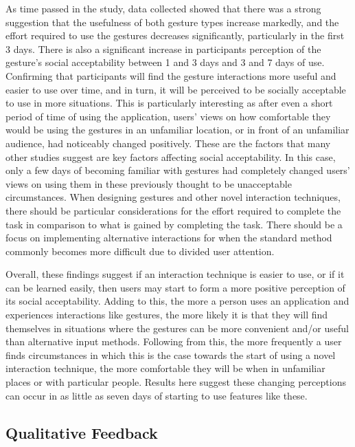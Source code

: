 \documentclass{l4proj}
\begin{document}
As time passed in the study, data collected showed that there was a strong suggestion that the usefulness of both gesture types increase markedly, and the effort required to use the gestures decreases significantly, particularly in the first 3 days. There is also a significant increase in participants perception of the gesture’s social acceptability between 1 and 3 days and 3 and 7 days of use. Confirming that participants will find the gesture interactions more useful and easier to use over time, and in turn, it will be perceived to be socially acceptable to use in more situations. This is particularly interesting as after even a short period of time of using the application, users’ views on how comfortable they would be using the gestures in an unfamiliar location, or in front of an unfamiliar audience, had noticeably changed positively. These are the factors that many other studies \citep{rico_usable_2010, freeman_rhythmic_2017, ahlstrom_are_2014} suggest are key factors affecting social acceptability. In this case, only a few days of becoming familiar with gestures had completely changed users’ views on using them in these previously thought to be unacceptable circumstances. When designing gestures and other novel interaction techniques, there should be particular considerations for the effort required to complete the task in comparison to what is gained by completing the task. There should be a focus on implementing alternative interactions for when the standard method commonly becomes more difficult due to divided user attention.

Overall, these findings suggest if an interaction technique is easier to use, or if it can be learned easily, then users may start to form a more positive perception of its social acceptability. Adding to this, the more a person uses an application and experiences interactions like gestures, the more likely it is that they will find themselves in situations where the gestures can be more convenient and/or useful than alternative input methods. Following from this, the more frequently a user finds circumstances in which this is the case towards the start of using a novel interaction technique, the more comfortable they will be when in unfamiliar places or with particular people. Results here suggest these changing perceptions can occur in as little as seven days of starting to use features like these.

\subsection{Qualitative Feedback}
\end{document}
